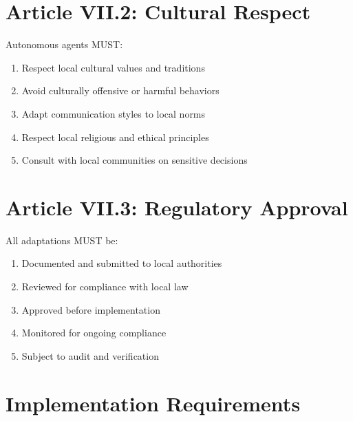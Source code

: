 \vspace{0.5cm}

\section{Article VII.2: Cultural Respect}

\begin{articlebox}
Autonomous agents MUST:
\begin{enumerate}
    \item Respect local cultural values and traditions
    \item Avoid culturally offensive or harmful behaviors
    \item Adapt communication styles to local norms
    \item Respect local religious and ethical principles
    \item Consult with local communities on sensitive decisions
\end{enumerate}
\end{articlebox}

\vspace{0.5cm}

\section{Article VII.3: Regulatory Approval}

\begin{articlebox}
All adaptations MUST be:
\begin{enumerate}
    \item Documented and submitted to local authorities
    \item Reviewed for compliance with local law
    \item Approved before implementation
    \item Monitored for ongoing compliance
    \item Subject to audit and verification
\end{enumerate}
\end{articlebox}

\vspace{0.5cm}

\section{Implementation Requirements}

